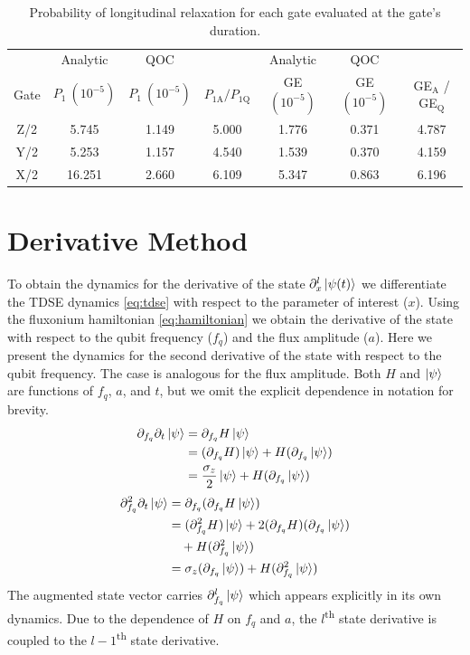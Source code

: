 \documentclass[
  amsfonts,
  amsmath,
  tbtags,
  amssymb,
  aps,
  nobibnotes,
  twocolumn,
  superscriptaddress,
]{revtex4-2}
\begin{document}
\begin{table}[ht]
  \begin{tabular}{c | c | c | c | c | c | c}
         & Analytic & QOC & & Analytic & QOC & \\
    Gate & $P_{1}\ (10^{-5})$ & $P_{1}\ (10^{-5})$ & $P_{1\textrm{A}} / P_{1\textrm{Q}}$
    & GE $(10^{-5})$ & GE $(10^{-5})$ & GE$_{\textrm{A}}$ / GE$_{\textrm{Q}}$\\
    \hline
    Z/2 & 5.745  & 1.149 & 5.000 & 1.776 & 0.371 & 4.787\\
    Y/2 & 5.253  & 1.157 & 4.540 & 1.539 & 0.370 & 4.159\\
    X/2 & 16.251 & 2.660 & 6.109 & 5.347 & 0.863 & 6.196\\
  \end{tabular}
  \caption{Probability of longitudinal relaxation for each gate
    evaluated at the gate's duration.}
\end{table}

\section{Derivative Method}
To obtain the dynamics for the derivative of the state $\partial_{x}^{l} \ket{\psi(t)}$
we differentiate the TDSE dynamics \ref{eq:tdse} with respect to the parameter of interest
($x$). Using the fluxonium hamiltonian \ref{eq:hamiltonian} we obtain the derivative of the
state with respect to the qubit frequency ($f_{q}$) and the flux amplitude ($a$).
Here we present the dynamics for the second derivative of the state with respect to the
qubit frequency. The case is analogous for the flux amplitude. Both $H$ and $\ket{\psi}$ are functions
of $f_{q}$, $a$, and $t$, but we omit the explicit dependence in notation for
brevity.
\begin{equation}
  \begin{aligned}
      \partial_{f_{q}} \partial_{t} \ket{\psi} &= \partial_{f_{q}} H \ket{\psi}\\
      &= (\partial_{f_{q}} H) \ket{\psi} + H (\partial_{f_{q}} \ket{\psi})\\
      &= \frac{\sigma_{z}}{2} \ket{\psi} + H (\partial_{f_{q}} \ket{\psi})
  \end{aligned}
\end{equation}
\begin{equation}
  \begin{aligned}
    \partial_{f_{q}}^{2} \partial_{t} \ket{\psi} &= \partial_{f_{q}} (\partial_{f_{q}} H \ket{\psi})\\
    &= (\partial_{f_{q}}^{2} H) \ket{\psi} + 2 (\partial_{f_{q}} H)(\partial_{f_{q}} \ket{\psi})\\
    &\quad + H (\partial_{f_{q}}^{2} \ket{\psi})\\
    &= \sigma_{z} (\partial_{f_{q}} \ket{\psi}) + H (\partial_{f_{q}}^{2} \ket{\psi})
  \end{aligned}
\end{equation}
The augmented state vector carries $\partial_{f_{q}}^{l} \ket{\psi}$
which appears explicitly in its own dynamics. Due to the dependence of $H$ on $f_{q}$ and $a$,
the $l$\textsuperscript{th} state derivative is coupled to the
$l - 1$\textsuperscript{th} state derivative.
\end{document}
